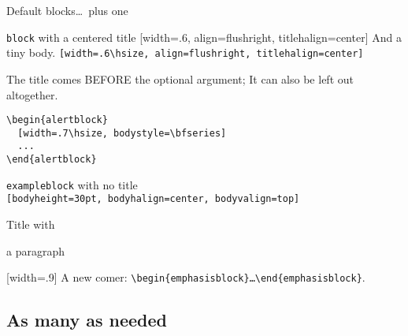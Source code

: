 \documentclass[9pt]{beamer}
\def\env#1{%
  \texttt{\textbackslash begin\{#1\}\dots\textbackslash end\{#1\}}}
\def\params#1{\texttt{[#1]}}
\let\environment\env
\let\parameters\params
\begin{document}
\begin{frame}[fragile]
  {Default blocks\dots\ plus one}

  \begin{block}
    {\texttt{block} with a centered title}
    [width=.6\hsize, align=flushright, titlehalign=center]
    And a tiny body.
    \parameters{width=.6\textbackslash hsize, align=flushright,
      titlehalign=center}
  \end{block}

  \begin{alertblock}
    [width=.7\hsize, bodystyle=\bfseries]
    The title comes BEFORE the optional argument; It can also be left
    out altogether.
\begin{verbatim}
\begin{alertblock}
  [width=.7\hsize, bodystyle=\bfseries]
  ...
\end{alertblock}
\end{verbatim}
  \end{alertblock}

  \begin{exampleblock}
    [bodyheight=30pt, bodyhalign=center, bodyvalign=top]
    \texttt{exampleblock} with no title\\
    \parameters{bodyheight=30pt, bodyhalign=center,  bodyvalign=top}
  \end{exampleblock}

  \begin{emphasisblock}
    {Title with\par\hfill a paragraph}
    [width=.9\hsize]
    A new comer: \environment{emphasisblock}.
  \end{emphasisblock}

\end{frame}


\subsection{As many as needed}
\end{document}
